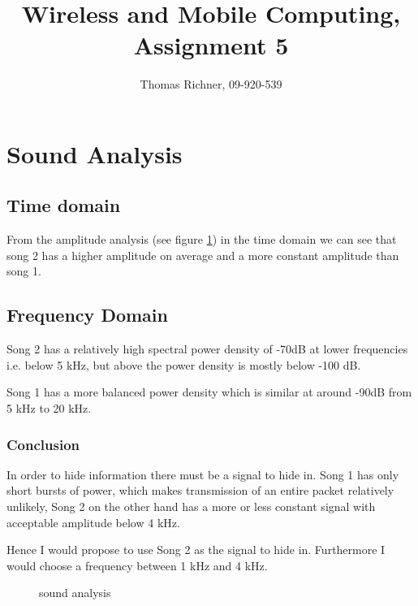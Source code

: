 \documentclass[12pt]{article}
\title{\textbf{Wireless and Mobile Computing, Assignment 5}}
\author{Thomas Richner, 09-920-539}
\begin{document}
\maketitle

\section{Sound Analysis}
 
\subsection{Time domain}
From the amplitude analysis (see figure \ref{fig:graphs}) in the time domain we can see that song 2 has a higher amplitude on average and a more constant amplitude than song 1.
\subsection{Frequency Domain}
Song 2 has a relatively high spectral power density of -70dB at lower frequencies i.e. below 5 kHz, but above the power density is mostly below -100 dB. \

Song 1 has a more balanced power density which is similar at around -90dB from 5 kHz to 20 kHz.

\subsubsection{Conclusion}
In order to hide information there must be a signal to hide in. Song 1 has only short bursts of power, which makes transmission of an entire packet relatively unlikely, Song 2 on the other hand has a more or less constant signal with acceptable amplitude below 4 kHz.

Hence I would propose to use Song 2 as the signal to hide in. Furthermore I would choose a frequency between 1 kHz and 4 kHz.


\begin{figure}
\centering
{}
\hspace{0mm}
\hspace{0mm}
\caption{sound analysis \label{fig:graphs}}
\end{figure}
\end{document}
